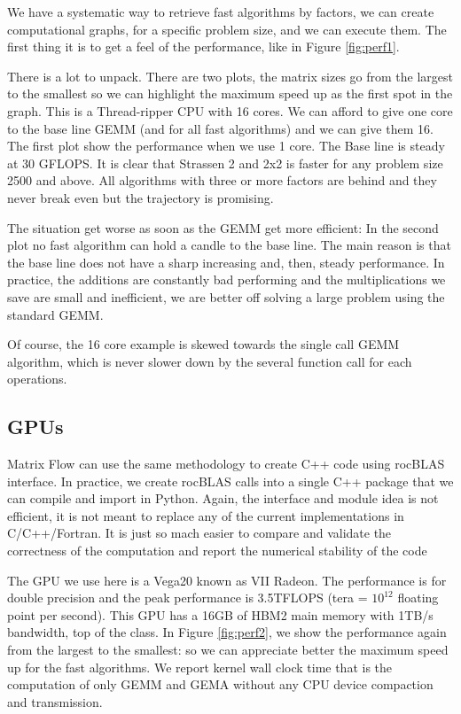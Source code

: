 \documentclass[acmsmall]{acmart}
\begin{document}
We have a systematic way to retrieve fast algorithms by factors, we
can create computational graphs, for a specific problem size, and we
can execute them. The first thing it is to get a feel of the
performance, like in Figure \ref{fig:perf1}.


There is a lot to unpack. There are two plots, the matrix sizes go
from the largest to the smallest so we can highlight the maximum speed
up as the first spot in the graph.  This is a Thread-ripper CPU with
16 cores. We can afford to give one core to the base line GEMM (and
for all fast algorithms) and we can give them 16. The first plot show
the performance when we use 1 core.  The Base line is steady at 30
GFLOPS. It is clear that Strassen 2 and 2x2 is faster for any problem
size 2500 and above. All algorithms with three or more factors are
behind and they never break even but the trajectory is promising. 

The situation get worse as soon as the GEMM get more efficient: In the
second plot no fast algorithm can hold a candle to the base line. The
main reason is that the base line does not have a sharp increasing
and, then, steady performance. In practice, the additions are
constantly bad performing and the multiplications we save are small
and inefficient, we are better off solving a large problem using the
standard GEMM.

Of course, the 16 core example is skewed towards the single call GEMM
algorithm, which is never slower down by the several function call for
each operations.

\subsection{GPUs}
Matrix Flow can use the same methodology to create C++ code using
rocBLAS interface. In practice, we create rocBLAS calls into a single
C++ package that we can compile and import in Python. Again, the
interface and module idea is not efficient, it is not meant to replace
any of the current implementations in C/C++/Fortran. It is just so
mach easier to compare and validate the correctness of the computation
and report the numerical stability of the code



The GPU we use here is a Vega20 known as VII Radeon. The performance
is for double precision and the peak performance is 3.5TFLOPS (tera =
$10^{12}$ floating point per second). This GPU has a 16GB of HBM2 main
memory with 1TB/s bandwidth, top of the class.  In Figure
\ref{fig:perf2}, we show the performance again from the largest to the
smallest: so we can appreciate better the maximum speed up for the
fast algorithms. We report kernel wall clock time that is the
computation of only GEMM and GEMA without any CPU device compaction
and transmission.
\end{document}
